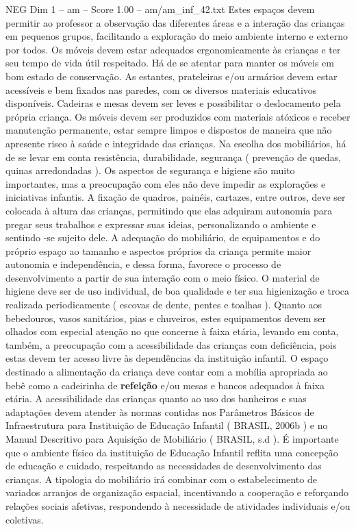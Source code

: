 \begin{textsample}{NEG Dim 1 – am – Score 1.00 – am/am\_inf\_42.txt}
Estes espaços devem permitir ao professor a observação das diferentes áreas e a interação das crianças em pequenos grupos, facilitando a exploração do meio ambiente interno e externo por todos.
Os móveis devem estar adequados ergonomicamente às crianças e ter seu tempo de vida útil respeitado.
Há de se atentar para manter os móveis em bom estado de conservação.
As estantes, prateleiras e/ou armários devem estar acessíveis e bem fixados nas paredes, com os diversos materiais educativos disponíveis.
Cadeiras e mesas devem ser leves e possibilitar o deslocamento pela própria criança.
Os móveis devem ser produzidos com materiais atóxicos e receber manutenção permanente, estar sempre limpos e dispostos de maneira que não apresente risco à saúde e integridade das crianças.
Na escolha dos mobiliários, há de se levar em conta resistência, durabilidade, segurança ( prevenção de quedas, quinas arredondadas ).
Os aspectos de segurança e higiene são muito importantes, mas a preocupação com eles não deve impedir as explorações e iniciativas infantis.
A fixação de quadros, painéis, cartazes, entre outros, deve ser colocada à altura das crianças, permitindo que elas adquiram autonomia para pregar seus trabalhos e expressar suas ideias, personalizando o ambiente e sentindo -se sujeito dele.
A adequação do mobiliário, de equipamentos e do próprio espaço ao tamanho e aspectos próprios da criança permite maior autonomia e independência, e dessa forma, favorece o processo de desenvolvimento a partir de sua interação com o meio físico.
O material de higiene deve ser de uso individual, de boa qualidade e ter sua higienização e troca realizada periodicamente ( escovas de dente, pentes e toalhas ).
Quanto aos bebedouros, vasos sanitários, pias e chuveiros, estes equipamentos devem ser olhados com especial atenção no que concerne à faixa etária, levando em conta, também, a preocupação com a acessibilidade das crianças com deficiência, pois estas devem ter acesso livre às dependências da instituição infantil.
O espaço destinado a alimentação da criança deve contar com a mobília apropriada ao bebê como a cadeirinha de \textbf{refeição} e/ou mesas e bancos adequados à faixa etária.
A acessibilidade das crianças quanto ao uso dos banheiros e suas adaptações devem atender às normas contidas nos Parâmetros Básicos de Infraestrutura para Instituição de Educação Infantil ( BRASIL, 2006b ) e no Manual Descritivo para Aquisição de Mobiliário ( BRASIL, s.d ).
É importante que o ambiente físico da instituição de Educação Infantil reflita uma concepção de educação e cuidado, respeitando as necessidades de desenvolvimento das crianças.
A tipologia do mobiliário irá combinar com o estabelecimento de variados arranjos de organização espacial, incentivando a cooperação e reforçando relações sociais afetivas, respondendo à necessidade de atividades individuais e/ou coletivas.

\end{textsample}
